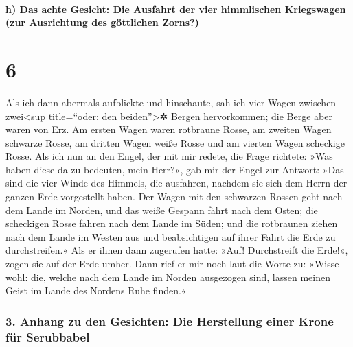 \hypertarget{h-das-achte-gesicht-die-ausfahrt-der-vier-himmlischen-kriegswagen-zur-ausrichtung-des-guxf6ttlichen-zorns}{%
\paragraph{h) Das achte Gesicht: Die Ausfahrt der vier himmlischen
Kriegswagen (zur Ausrichtung des göttlichen
Zorns?)}\label{h-das-achte-gesicht-die-ausfahrt-der-vier-himmlischen-kriegswagen-zur-ausrichtung-des-guxf6ttlichen-zorns}}

\hypertarget{section-5}{%
\section{6}\label{section-5}}

 Als ich dann abermals aufblickte und hinschaute, sah ich
vier Wagen zwischen zwei\textless sup title=``oder: den
beiden''\textgreater✲ Bergen hervorkommen; die Berge aber waren von Erz.
 Am ersten Wagen waren rotbraune Rosse, am zweiten Wagen
schwarze Rosse,  am dritten Wagen weiße Rosse und am
vierten Wagen scheckige Rosse.  Als ich nun an den Engel,
der mit mir redete, die Frage richtete: »Was haben diese da zu bedeuten,
mein Herr?«,  gab mir der Engel zur Antwort: »Das sind die
vier Winde des Himmels, die ausfahren, nachdem sie sich dem Herrn der
ganzen Erde vorgestellt haben.  Der Wagen mit den
schwarzen Rossen geht nach dem Lande im Norden, und das weiße Gespann
fährt nach dem Osten; die scheckigen Rosse fahren nach dem Lande im
Süden;  und die rotbraunen ziehen nach dem Lande im Westen
aus und beabsichtigen auf ihrer Fahrt die Erde zu durchstreifen.« Als er
ihnen dann zugerufen hatte: »Auf! Durchstreift die Erde!«, zogen sie auf
der Erde umher.  Dann rief er mir noch laut die Worte zu:
»Wisse wohl: die, welche nach dem Lande im Norden ausgezogen sind,
lassen meinen Geist im Lande des Nordens Ruhe finden.«

\hypertarget{anhang-zu-den-gesichten-die-herstellung-einer-krone-fuxfcr-serubbabel}{%
\subsubsection{3. Anhang zu den Gesichten: Die Herstellung einer Krone
für
Serubbabel}\label{anhang-zu-den-gesichten-die-herstellung-einer-krone-fuxfcr-serubbabel}}

